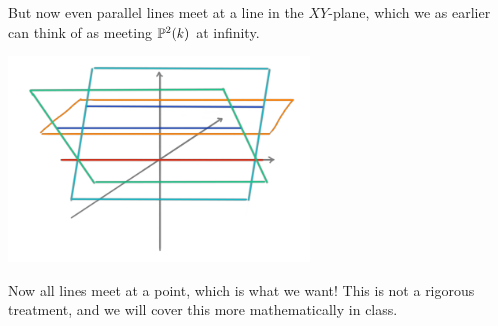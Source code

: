 \begin{solution}
But now even parallel lines meet at a line in the $XY$-plane, which we as earlier can think of as meeting $\P^2(k)$ at infinity. 

\begin{center}
\includegraphics[width=8cm]{img/lecture_5/projective6.png}
\end{center}

Now all lines meet at a point, which is what we want! This is not a rigorous treatment, and we will cover this more mathematically in class. 

\end{solution}

\fi